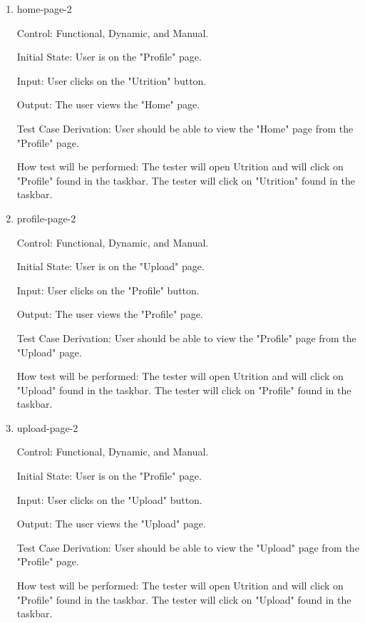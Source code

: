 \documentclass[12pt, titlepage]{article}
\begin{document}
\begin{enumerate}
		\item{home-page-2\\}
		
		Control: Functional, Dynamic, and Manual.
		
		Initial State: User is on the "Profile" page.
		
		Input: User clicks on the "Utrition" button.
		
		Output: The user views the "Home" page.
		
		Test Case Derivation: User should be able to view the "Home" page from the "Profile" page.
		
		How test will be performed: The tester will open Utrition and will click on "Profile" found in the taskbar. The tester will click on "Utrition" found in the taskbar.
		
		\item{profile-page-2\\}
		
		Control: Functional, Dynamic, and Manual.
		
		Initial State: User is on the "Upload" page.
		
		Input: User clicks on the "Profile" button.
		
		Output: The user views the "Profile" page.
		
		Test Case Derivation: User should be able to view the "Profile" page from the "Upload" page.
		
		How test will be performed: The tester will open Utrition and will click on "Upload" found in the taskbar. The tester will click on "Profile" found in the taskbar.
		
		\item{upload-page-2\\}
		
		Control: Functional, Dynamic, and Manual.
		
		Initial State: User is on the "Profile" page.
		
		Input: User clicks on the "Upload" button.
		
		Output: The user views the "Upload" page.
		
		Test Case Derivation: User should be able to view the "Upload" page from the "Profile" page.
		
		How test will be performed: The tester will open Utrition and will click on "Profile" found in the taskbar. The tester will click on "Upload" found in the taskbar.
		
	\end{enumerate}
	
\end{document}
